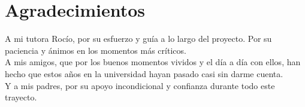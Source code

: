 \chapter*{Agradecimientos}
\thispagestyle{empty}

       \vspace{1cm}


A mi tutora Rocío, por su esfuerzo y guía a lo largo del proyecto. Por su paciencia y ánimos en los momentos más críticos.
\\

A mis amigos, que por los buenos momentos vividos y el día a día con ellos, han hecho que estos años en la universidad hayan pasado casi sin darme cuenta.
\\

Y a mis padres, por su apoyo incondicional y confianza durante todo este trayecto. 